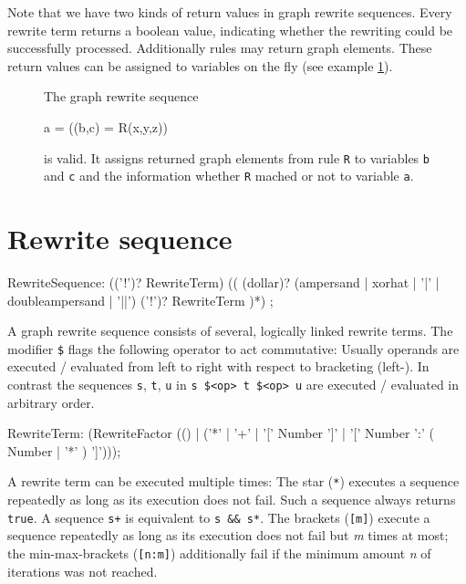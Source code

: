 Note that we have two kinds of return values in graph rewrite sequences.
Every rewrite term returns a boolean value, indicating whether the rewriting could be successfully processed.
Additionally rules may return graph elements.
These return values can be assigned to variables on the fly (see example \ref{ex:grsreturn}).
\begin{figure}[htbp]
\begin{example}
	\label{ex:grsreturn}
	The graph rewrite sequence
	\begin{grgen}	 
a = ((b,c) = R(x,y,z))
	\end{grgen}
	is valid. 
	It assigns returned graph elements from rule \texttt{R} to variables \texttt{b} and \texttt{c} and the information whether \texttt{R} mached or not to variable \texttt{a}.
\end{example}
\end{figure}

\section{Rewrite sequence}

\makeatletter

\begin{rail}
  RewriteSequence: 
    (('!')? RewriteTerm) (( (dollar)? (ampersand | xorhat | '|' | doubleampersand | '||') ('!')? RewriteTerm )*) ;
\end{rail}

A graph rewrite sequence consists of several, logically linked rewrite terms.
The modifier \texttt{\$} flags the following operator to act commutative: Usually operands are executed / evaluated from left to right with respect to bracketing (left-). 
In contrast the sequences \texttt{s}, \texttt{t}, \texttt{u} in \texttt{s \$<op> t \$<op> u} are executed / evaluated in arbitrary order.

\begin{rail}
  RewriteTerm: 
    (RewriteFactor (() | ('*' | '+' | '[' Number ']' | '[' Number ':' ( Number | '*' ) ']')));
\end{rail}

A rewrite term can be executed multiple times: The star (\texttt{*}) executes a sequence repeatedly as long as its execution does not fail. 
Such a sequence always returns \texttt{true}.
A sequence \verb#s+# is equivalent to \verb#s && s*#.
The brackets (\texttt{[m]}) execute a sequence repeatedly as long as its execution does not fail but \emph{m} times at most; the min-max-brackets (\texttt{[n:m]}) additionally fail if the minimum amount \emph{n} of iterations was not reached.

